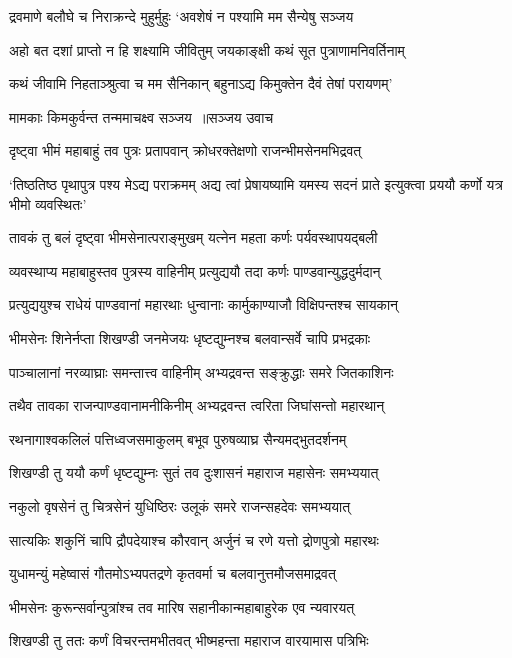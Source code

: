\twolineshloka
{द्रवमाणे बलौघे च निराक्रन्दे मुहुर्मुहुः}
{`अवशेषं न पश्यामि मम सैन्येषु सञ्जय}


\twolineshloka
{अहो बत दशां प्राप्तो न हि शक्ष्यामि जीवितुम्}
{जयकाङ्क्षी कथं सूत पुत्राणामनिवर्तिनाम्}


\twolineshloka
{कथं जीवामि निहताञ्श्रुत्वा च मम सैनिकान्}
{बहुनाऽद्य किमुक्तेन दैवं तेषां परायणम्'}


\twolineshloka
{मामकाः किमकुर्वन्त तन्ममाचक्ष्व सञ्जय ॥सञ्जय उवाच}
{}


\twolineshloka
{दृष्ट्वा भीमं महाबाहुं तव पुत्रः प्रतापवान्}
{क्रोधरक्तेक्षणो राजन्भीमसेनमभिद्रवत्}


\threelineshloka
{`तिष्ठतिष्ठ पृथापुत्र पश्य मेऽद्य पराक्रमम्}
{अद्य त्वां प्रेषायष्यामि यमस्य सदनं प्राते}
{इत्युक्त्वा प्रययौ कर्णो यत्र भीमो व्यवस्थितः'}


\twolineshloka
{तावकं तु बलं दृष्ट्वा भीमसेनात्पराङ्मुखम्}
{यत्नेन महता कर्णः पर्यवस्थापयद्बली}


\twolineshloka
{व्यवस्थाप्य महाबाहुस्तव पुत्रस्य वाहिनीम्}
{प्रत्युद्ययौ तदा कर्णः पाण्डवान्युद्धदुर्मदान्}


\twolineshloka
{प्रत्युद्ययुश्च राधेयं पाण्डवानां महारथाः}
{धुन्वानाः कार्मुकाण्याजौ विक्षिपन्तश्च सायकान्}


\twolineshloka
{भीमसेनः शिनेर्नप्ता शिखण्डी जनमेजयः}
{धृष्टद्युम्नश्च बलवान्सर्वे चापि प्रभद्रकाः}


\twolineshloka
{पाञ्चालानां नरव्याघ्राः समन्तात्त्व वाहिनीम्}
{अभ्यद्रवन्त सङ्क्रुद्धाः समरे जितकाशिनः}


\twolineshloka
{तथैव तावका राजन्पाण्डवानामनीकिनीम्}
{अभ्यद्रवन्त त्वरिता जिघांसन्तो महारथान्}


\twolineshloka
{रथनागाश्वकलिलं पत्तिध्वजसमाकुलम्}
{बभूव पुरुषव्याघ्र सैन्यमद्भुतदर्शनम्}


\twolineshloka
{शिखण्डी तु ययौ कर्णं धृष्टद्युम्नः सुतं तव}
{दुःशासनं महाराज महासेनः समभ्ययात्}


\twolineshloka
{नकुलो वृषसेनं तु चित्रसेनं युधिष्ठिरः}
{उलूकं समरे राजन्सहदेवः समभ्ययात्}


\twolineshloka
{सात्यकिः शकुनिं चापि द्रौपदेयाश्च कौरवान्}
{अर्जुनं च रणे यत्तो द्रोणपुत्रो महारथः}


\twolineshloka
{युधामन्युं महेष्वासं गौतमोऽभ्यपतद्रणे}
{कृतवर्मा च बलवानुत्तमौजसमाद्रवत्}


\twolineshloka
{भीमसेनः कुरून्सर्वान्पुत्रांश्च तव मारिष}
{सहानीकान्महाबाहुरेक एव न्यवारयत्}


\twolineshloka
{शिखण्डी तु ततः कर्णं विचरन्तमभीतवत्}
{भीष्महन्ता महाराज वारयामास पत्रिभिः}


